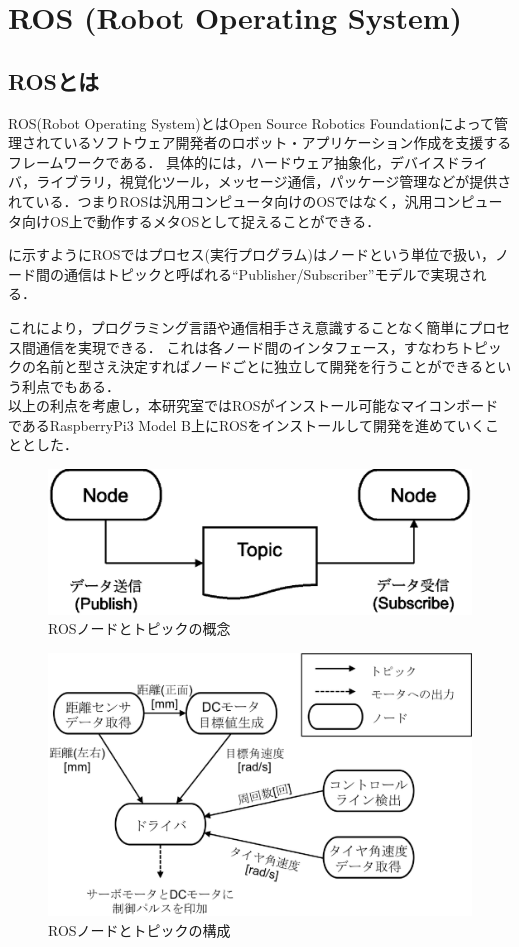 \section{ROS (Robot Operating System)}
\subsection{ROSとは}
ROS(Robot Operating System)とはOpen Source Robotics Foundationによって管理されているソフトウェア開発者のロボット・アプリケーション作成を支援するフレームワークである．
具体的には，ハードウェア抽象化，デバイスドライバ，ライブラリ，視覚化ツール，メッセージ通信，パッケージ管理などが提供されている．つまりROSは汎用コンピュータ向けのOSではなく，汎用コンピュータ向けOS上で動作するメタOSとして捉えることができる\cite{kurazume}．

に示すようにROSではプロセス(実行プログラム)はノードという単位で扱い，ノード間の通信はトピックと呼ばれる``Publisher/Subscriber''モデルで実現される\cite{ogura}．

これにより，プログラミング言語や通信相手さえ意識することなく簡単にプロセス間通信を実現できる．
これは各ノード間のインタフェース，すなわちトピックの名前と型さえ決定すればノードごとに独立して開発を行うことができるという利点でもある．\\

以上の利点を考慮し，本研究室ではROSがインストール可能なマイコンボードであるRaspberryPi3 Model B上にROSをインストールして開発を進めていくこととした．

\begin{figure}[htb]
  \centering
    \includegraphics[width=0.5\hsize]{picture/eps/ros_topic.eps}
    \caption{ROSノードとトピックの概念}
    \label{fig::ros_topic}
\end{figure}



\begin{figure}[htb]
  \centering
    \includegraphics[width=0.8\hsize]{picture/eps/ros_nodes.eps}
    \caption{ROSノードとトピックの構成}
    \label{fig::ros_nodes}
\end{figure}

